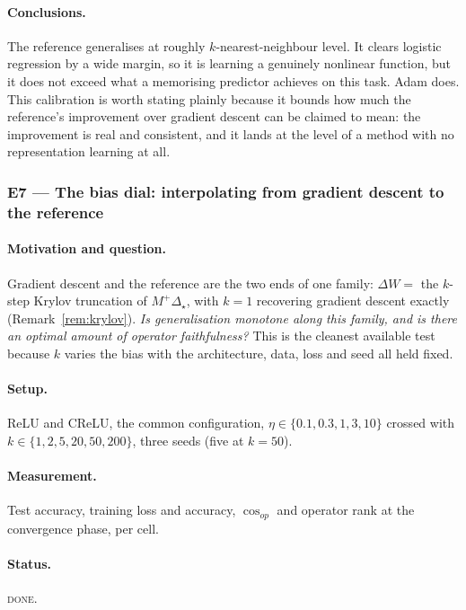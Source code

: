 \documentclass{article} %
\theoremstyle{plain}
\theoremstyle{definition}
\theoremstyle{remark}
\begin{document}
\paragraph{Conclusions.}
The reference generalises at roughly $k$-nearest-neighbour level. It clears logistic regression by
a wide margin, so it is learning a genuinely nonlinear function, but it does not exceed what a
memorising predictor achieves on this task. Adam does. This calibration is worth stating plainly
because it bounds how much the reference's improvement over gradient descent can be claimed to
mean: the improvement is real and consistent, and it lands at the level of a method with no
representation learning at all.

\subsubsection{E7 --- The bias dial: interpolating from gradient descent to the reference}
\label{sec:e7}

\paragraph{Motivation and question.}
Gradient descent and the reference are the two ends of one family: $\Delta W = $ the $k$-step
Krylov truncation of $M^{+}\Delta_\star$, with $k=1$ recovering gradient descent exactly
(Remark~\ref{rem:krylov}). \emph{Is generalisation monotone along this family, and is
there an optimal amount of operator faithfulness?} This is the cleanest available test because $k$
varies the bias with the architecture, data, loss and seed all held fixed.

\paragraph{Setup.}
ReLU and CReLU, the common configuration, $\eta \in \{0.1, 0.3, 1, 3, 10\}$ crossed with
$k \in \{1, 2, 5, 20, 50, 200\}$, three seeds (five at $k=50$).

\paragraph{Measurement.}
Test accuracy, training loss and accuracy, $\cos_{op}$ and operator rank at the convergence phase,
per cell.

\paragraph{Status.} \textsc{done}.
\end{document}
